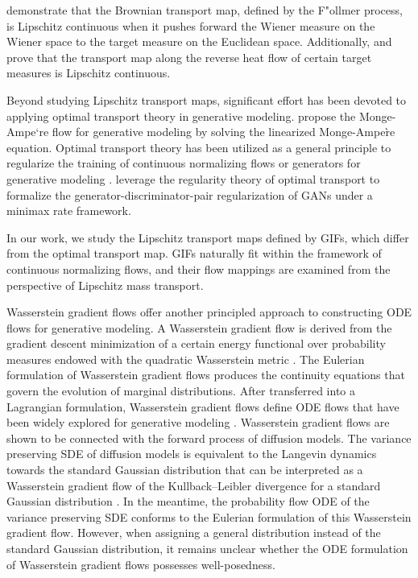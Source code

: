 \documentclass[twoside,11pt]{article}
\numberwithin{equation}{section}
\begin{document}
\citet{mikulincer2021brownian} demonstrate that the Brownian transport map, defined by the F{"o}llmer process, is Lipschitz continuous when it pushes forward the Wiener measure on the Wiener space to the target measure on the Euclidean space. Additionally, \citet{neeman2022lipschitz} and \citet{mikulincer2023lipschitz} prove that the transport map along the reverse heat flow of certain target measures is Lipschitz continuous.

Beyond studying Lipschitz transport maps, significant effort has been devoted to applying optimal transport theory in generative modeling. \citet{zhang2018monge} propose the Monge-Ampe{`r}e flow for generative modeling by solving the linearized Monge-Ampe{\`r}e equation. Optimal transport theory has been utilized as a general principle to regularize the training of continuous normalizing flows or generators for generative modeling \citep{finlay2020train, yang2020potential, onken2021ot, makkuva2020optimal}. \citet{liang2021well} leverage the regularity theory of optimal transport to formalize the generator-discriminator-pair regularization of GANs under a minimax rate framework.

In our work, we study the Lipschitz transport maps defined by GIFs, which differ from the optimal transport map. GIFs naturally fit within the framework of continuous normalizing flows, and their flow mappings are examined from the perspective of Lipschitz mass transport.

Wasserstein gradient flows offer another principled approach to constructing ODE flows for generative modeling. A Wasserstein gradient flow is derived from the gradient descent minimization of a certain energy functional over probability measures endowed with the quadratic Wasserstein metric \citep{ambrosio2008gradient}. The Eulerian formulation of Wasserstein gradient flows produces the continuity equations that govern the evolution of marginal distributions.
After transferred into a Lagrangian formulation, Wasserstein gradient flows define ODE flows that have been widely explored for generative modeling \citep{johnson2018composite, gao2019deep, liutkus2019sliced, johnson2019framework, arbel2019maximum, mroueh2019sobolev, ansari2021refining, mroueh2021convergence, fan2021variational, gao2022deep, duncan2023geometry, xu2022invertible}.
Wasserstein gradient flows are shown to be connected with the forward process of diffusion models.
The variance preserving SDE of diffusion models is equivalent to the Langevin dynamics towards the standard Gaussian distribution that can be interpreted as a Wasserstein gradient flow of the Kullback–Leibler divergence for a standard Gaussian distribution \citep{song2021scorebased}.
In the meantime, the probability flow ODE of the variance preserving SDE conforms to the Eulerian formulation of this Wasserstein gradient flow.
However, when assigning a general distribution instead of the standard Gaussian distribution, it remains unclear whether the ODE formulation of Wasserstein gradient flows possesses well-posedness.
\end{document}
